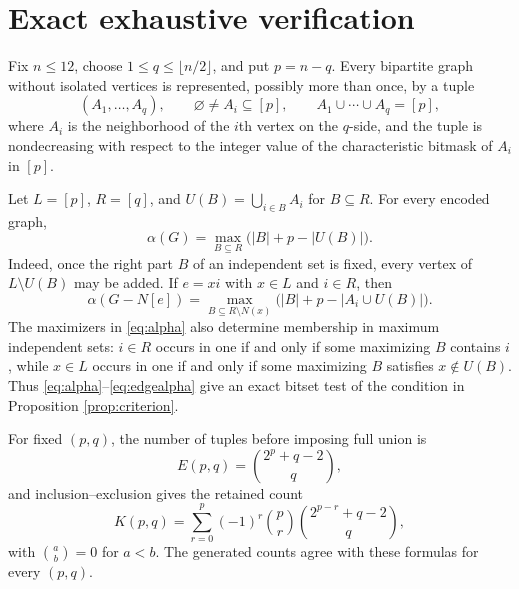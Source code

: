 \documentclass[11pt]{amsart}
\begin{document}
\section{Exact exhaustive verification}\label{sec:verification}

Fix $n\leq12$, choose $1\leq q\leq\lfloor n/2\rfloor$, and put $p=n-q$.
Every bipartite graph without isolated vertices is represented, possibly more
than once, by a tuple
\[
  (A_1,\ldots,A_q),
  \qquad
  \varnothing\neq A_i\subseteq[p],
  \qquad
  A_1\cup\cdots\cup A_q=[p],
\]
where $A_i$ is the neighborhood of the $i$th vertex on the $q$-side, and the
tuple is nondecreasing with respect to the integer value of the characteristic
bitmask of $A_i$ in $[p]$.

Let $L=[p]$, $R=[q]$, and $U(B)=\bigcup_{i\in B}A_i$ for $B\subseteq R$.
For every encoded graph,
\begin{equation}\label{eq:alpha}
  \alpha(G)=\max_{B\subseteq R}\bigl(|B|+p-|U(B)|\bigr).
\end{equation}
Indeed, once the right part $B$ of an independent set is fixed, every vertex of
$L\setminus U(B)$ may be added. If $e=xi$ with $x\in L$ and $i\in R$, then
\begin{equation}\label{eq:edgealpha}
  \alpha(G-N[e])
  =\max_{B\subseteq R\setminus N(x)}
  \bigl(|B|+p-|A_i\cup U(B)|\bigr).
\end{equation}
The maximizers in \eqref{eq:alpha} also determine membership in maximum
independent sets: $i\in R$ occurs in one if and only if some maximizing $B$
contains $i$, while $x\in L$ occurs in one if and only if some maximizing $B$
satisfies $x\notin U(B)$. Thus \eqref{eq:alpha}--\eqref{eq:edgealpha} give an
exact bitset test of the condition in Proposition \ref{prop:criterion}.

For fixed $(p,q)$, the number of tuples before imposing full union is
\[
  E(p,q)=\binom{2^p+q-2}{q},
\]
and inclusion--exclusion gives the retained count
\[
  K(p,q)=\sum_{r=0}^{p}(-1)^r\binom{p}{r}
  \binom{2^{p-r}+q-2}{q},
\]
with $\binom ab=0$ for $a<b$. The generated counts agree with these formulas
for every $(p,q)$.
\end{document}
